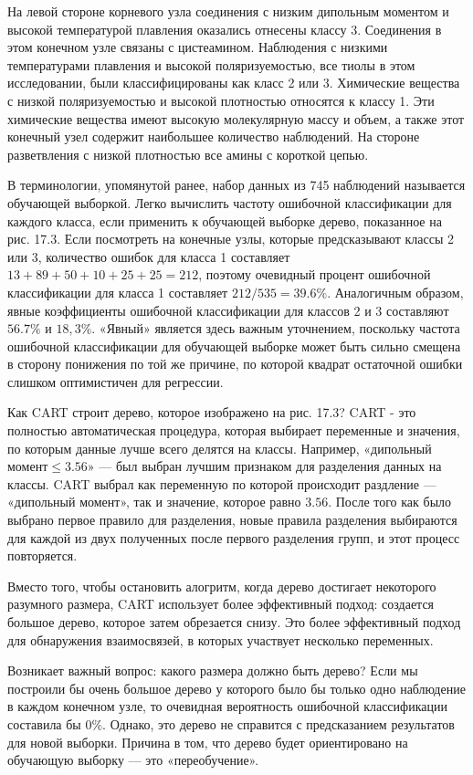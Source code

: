На левой стороне корневого узла соединения с низким дипольным моментом и высокой температурой плавления оказались отнесены классу 3. Соединения в этом конечном узле связаны с цистеамином. Наблюдения с низкими температурами плавления и высокой поляризуемостью, все тиолы в этом исследовании, были классифицированы как класс 2 или 3. Химические вещества с низкой поляризуемостью и высокой плотностью относятся к классу 1. Эти химические вещества имеют высокую молекулярную массу и объем, а также этот конечный узел содержит наибольшее количество наблюдений. На стороне разветвления с низкой плотностью все амины с короткой цепью.

В терминологии, упомянутой ранее, набор данных из 745 наблюдений называется обучающей выборкой. Легко вычислить частоту ошибочной классификации для каждого класса, если применить к обучающей выборке дерево, показанное на рис. 17.3. Если посмотреть на конечные узлы, которые предсказывают классы 2 или 3, количество ошибок для класса 1 составляет $13 + 89 + 50 + 10 + 25 + 25 = 212$, поэтому очевидный процент ошибочной классификации для класса 1 составляет $212/535 = 39.6 \%$. Аналогичным образом, явные коэффициенты ошибочной классификации для классов 2 и 3 составляют $56.7 \%$ и $18,3\%$. «Явный» является здесь важным уточнением, поскольку частота ошибочной классификации для обучающей выборке может быть сильно смещена в сторону понижения по той же причине, по которой квадрат остаточной ошибки слишком оптимистичен для регрессии.

Как CART строит дерево, которое изображено на рис. 17.3? CART - это полностью автоматическая процедура, которая выбирает переменные и значения, по которым  данные лучше всего делятся на классы. Например, «дипольный момент$\leq 3.56$» --- был выбран лучшим признаком для разделения данных на классы. CART выбрал как переменную по которой происходит раздление --- «дипольный момент», так и значение, которое равно $3.56$. После того как было выбрано первое правило для разделения, новые правила разделения выбираются для каждой из двух полученных после первого разделения групп, и этот процесс повторяется. 

Вместо того, чтобы остановить алогритм, когда дерево достигает некоторого разумного размера, CART использует более эффективный подход: создается большое дерево, которое затем обрезается снизу. Это более эффективный подход для обнаружения взаимосвязей, в которых участвует несколько переменных.

Возникает важный вопрос: какого размера должно быть дерево? Если мы построили бы очень большое дерево у которого было бы только одно наблюдение в каждом конечном узле, то очевидная вероятность ошибочной классификации составила бы $0 \%$. Однако, это дерево не справится с предсказанием результатов для новой выборки. Причина в том, что дерево будет ориентировано на обучающую выборку --- это «переобучение».

